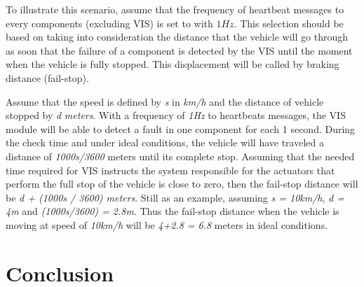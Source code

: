 \documentclass[conference]{IEEEtran}
\begin{document}

To illustrate this scenario, assume that the frequency of heartbeat messages to every components (excluding VIS) is set to with $1Hz$. This selection should be based on taking into consideration the distance that the vehicle will go through as soon that the failure of a component is detected by the VIS until the moment when the vehicle is fully stopped. This displacement will be called by braking distance (fail-stop).

Assume that the speed is defined by \textit{s} in \textit{km/h} and the distance of vehicle stopped by \textit{d} \textit{meters}. With a frequency of \textit{1Hz} to heartbeats messages, the VIS module will be able to detect a fault in one component for each 1 second. During the check time and under ideal conditions, the vehicle will have traveled a distance of \textit{1000s/3600} meters until its complete stop. Assuming that the needed time required for VIS instructs the system responsible for the actuators that perform the full stop of the vehicle is close to zero, then the fail-stop distance will be \textit{d + (1000s / 3600) meters}. Still as an example, assuming \textit{s = 10km/h}, \textit{d = 4m} and \textit{(1000s/3600) = 2.8m}. Thus the fail-stop distance when the vehicle is moving at speed of \textit{10km/h} will be \textit{4+2.8 = 6.8} meters in ideal conditions.
\section{Conclusion}\label{sec:conclusion}
\end{document}
